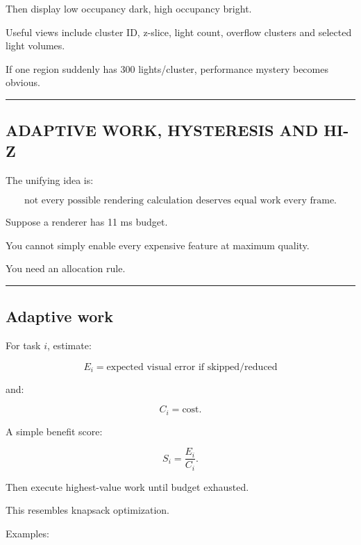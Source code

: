 Then display low occupancy dark, high occupancy bright.

Useful views include cluster ID, z-slice, light count, overflow clusters and selected light volumes.

If one region suddenly has 300 lights/cluster, performance mystery becomes obvious.

\begin{center}\rule{0.5\linewidth}{0.5pt}\end{center}

\subsection{ADAPTIVE WORK, HYSTERESIS AND HI-Z}\label{04-visual-computing-ii-ch040-adaptive-work-hysteresis-and-hi-z}

\hypertarget{04-visual-computing-ii-ch040-adaptive-work-hysteresis-and-hi-z}{}

The unifying idea is:

\[
\boxed{
\text{not every possible rendering calculation deserves equal work every frame}.
}
\]

Suppose a renderer has 11 ms budget.

You cannot simply enable every expensive feature at maximum quality.

You need an allocation rule.

\begin{center}\rule{0.5\linewidth}{0.5pt}\end{center}

\subsection{Adaptive work}\label{04-visual-computing-ii-ch040-adaptive-work}

\hypertarget{04-visual-computing-ii-ch040-adaptive-work}{}

For task \(i\), estimate:

\[
E_i=
\text{expected visual error if skipped/reduced}
\]

and:

\[
C_i=
\text{cost}.
\]

A simple benefit score:

\[
\boxed{
S_i=
\frac{E_i}{C_i}.
}
\]

Then execute highest-value work until budget exhausted.

This resembles knapsack optimization.

Examples:

